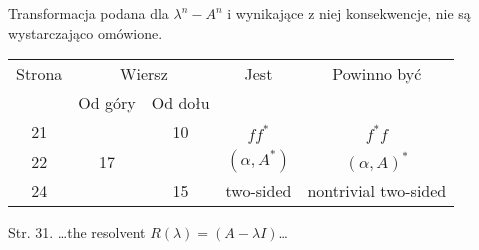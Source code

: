 \documentclass[a4paper,11pt]{article}
\begin{document}
\vspace{\VerSpaceFour}





\noindent
{} Transformacja podana dla $\lambda^{ n } - A^{ n }$ i
wynikające z niej konsekwencje, nie są wystarczająco omówione.

\vspace{\VerSpaceFour}






\newpage



\begin{center}
  \begin{tabular}{|c|c|c|c|c|}
    \hline
    Strona & \multicolumn{2}{c|}{Wiersz} & Jest
                              & Powinno być \\ \cline{2-3}
    & Od góry & Od dołu & & \\
    \hline
    21  & & 10 & $f f^{ * }$ & $f^{ * } f$ \\
    22  & 17 & & $( \alpha, A^{ * } )$ & $( \alpha, A )^{ * }$ \\
    24 & & 15 & two-sided & nontrivial two-sided \\
    \hline
  \end{tabular}

\end{center}

\vspace{\VerSpaceSix}


Str. 31. \ldots the resolvent $R( \lambda ) = ( A - \lambda I )$\ldots
\end{document}
